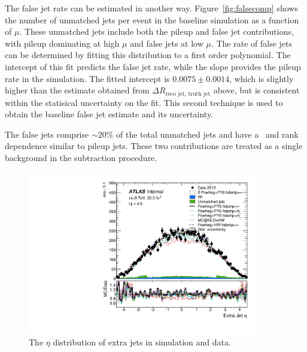 The false jet rate can be estimated in another way. Figure~\ref{fig:falsecomp} shows the number of unmatched jets per event in the baseline simulation as a function of $\mu$. These unmatched jets include both the pileup and false jet contributions, with pileup dominating at high $\mu$ and false jets at low $\mu$. The rate of false jets can be determined by fitting this distribution to a first order polynomial. The intercept of this fit predicts the false jet rate, while the slope provides the pileup rate in the simulation. The fitted intercept is $0.0075 \pm   0.0014$, which is slightly higher than the estimate obtained from $\Delta {R}_{\text{reco jet, truth jet}}$ above, but is consistent
within the statisical uncertainty on the fit.   This second technique is used to obtain the baseline false jet estimate and its uncertainty.

The false jets comprise $\sim 20\%$ of the total unmatched jets and have a \pt\ and rank dependence similar to pileup jets. These two contributions are treated as a single background in the subtraction procedure.
\begin{figure}
\centering
\includegraphics[width=0.9\textwidth]{fig/MCComp/NLO/ExtraJetEta.pdf}
\caption{The $\eta$ distribution of extra jets in simulation and data.}
\label{fig:jeteta}
\end{figure}

